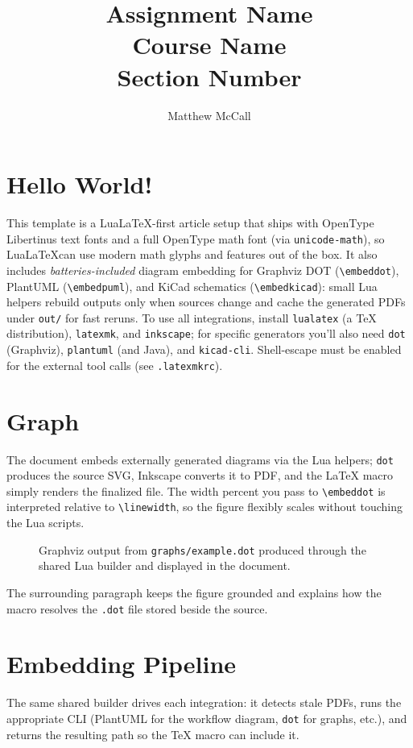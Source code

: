 \documentclass[12pt]{article}
\title{Assignment Name \\ \large Course Name \\ Section Number}
\author{Matthew McCall}
\begin{document}
\maketitle
\doublespacing{}

\section{Hello World!}
This template is a Lua\LaTeX-first article setup that ships with OpenType Libertinus text fonts and a full OpenType math font (via \lstinline|unicode-math|), so Lua\LaTeX can use modern math glyphs and features out of the box. It also includes \emph{batteries-included} diagram embedding for Graphviz DOT (\lstinline|\embeddot|), PlantUML (\lstinline|\embedpuml|), and KiCad schematics (\lstinline|\embedkicad|): small Lua helpers rebuild outputs only when sources change and cache the generated PDFs under \lstinline|out/| for fast reruns. To use all integrations, install \lstinline|lualatex| (a TeX distribution), \lstinline|latexmk|, and \lstinline|inkscape|; for specific generators you’ll also need \lstinline|dot| (Graphviz), \lstinline|plantuml| (and Java), and \lstinline|kicad-cli|. Shell-escape must be enabled for the external tool calls (see \lstinline|.latexmkrc|).

\section{Graph}
The document embeds externally generated diagrams via the Lua helpers; \lstinline|dot| produces the source SVG, Inkscape converts it to PDF, and the LaTeX macro simply renders the finalized file. The width percent you pass to \lstinline|\embeddot| is interpreted relative to \lstinline|\linewidth|, so the figure flexibly scales without touching the Lua scripts.

\begin{figure}[htbp]
  \centering
  \caption{Graphviz output from \lstinline|graphs/example.dot| produced through the shared Lua builder and displayed in the document.}
\end{figure}

The surrounding paragraph keeps the figure grounded and explains how the macro resolves the \lstinline|.dot| file stored beside the source.

\section{Embedding Pipeline}
The same shared builder drives each integration: it detects stale PDFs, runs the appropriate CLI (PlantUML for the workflow diagram, \lstinline|dot| for graphs, etc.), and returns the resulting path so the TeX macro can include it.
\end{document}
